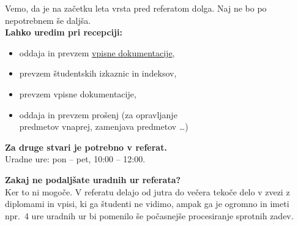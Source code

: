\documentclass[a4paper,oneside,12pt]{article}
\title{\Title}
\author{\Author}
\date{\today}
\theoremstyle{definition}
\begin{document}
\thispagestyle{empty}  %

\fontsize{48}{48}\selectfont

Vemo, da je na začetku leta vrsta pred referatom dolga.
Naj ne bo po nepotrebnem še daljša. \\[12pt]

\fontsize{28}{28}\selectfont
\textbf{Lahko uredim pri recepciji:}
\fontsize{24}{24}\selectfont
\begin{itemize}
  \item oddaja in prevzem \href{http://www.fmf.uni-lj.si/si/obvestila/39071}{vpisne
    dokumentacije},
  \item prevzem študentskih izkaznic in indeksov,
  \item prevzem  vpisne dokumentacije,
  \item oddaja in prevzem prošenj (za opravljanje \\ predmetov vnaprej, zamenjava predmetov \dots)
\end{itemize}

\vspace{32pt}

\textbf{Za druge stvari je potrebno v referat.} \\[2ex]
Uradne ure: pon -- pet, 10:00 -- 12:00.

\vfill


\fontsize{18}{18}\selectfont
\textbf{Zakaj ne podaljšate uradnih ur referata?} \\[6pt]
Ker to ni mogoče. V referatu delajo od jutra do večera tekoče delo v zvezi z
diplomami in vpisi, ki ga študenti ne vidimo, ampak ga je ogromno in imeti npr.\
4 ure uradnih ur bi pomenilo še počasnejše procesiranje sprotnih zadev.
\end{document}
